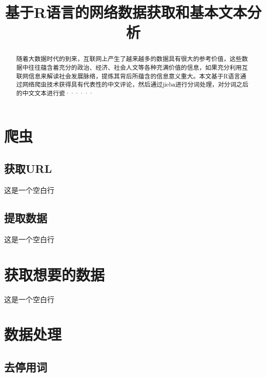 \documentclass[a4paper]{ctexart}     %
\begin{document}
\songti{}
	{\heiti
	\title{基于R语言的网络数据获取和基本文本分析}
	\date{}
	\maketitle
	}
	

	\begin{abstract}
		随着大数据时代的到来，互联网上产生了越来越多的数据具有很大的参考价值，这些数据中往往蕴含着充分的政治、经济、社会人文等各种充满价值的信息，如果充分利用互联网信息来解读社会发展脉络，提炼其背后所蕴含的信息意义重大。本文基于R语言通过网络爬虫技术获得具有代表性的中文评论，然后通过jieba进行分词处理，对分词之后的中文文本进行瓷······
		
		
		\vspace*{1\baselineskip}   %
		
	\end{abstract}

	\tableofcontents  %
	\newpage
	\section{爬虫}
	\subsection{获取URL}

	
	这是一个空白行
	\subsection{提取数据}
	
	这是一个空白行
	
	\section{获取想要的数据}

	这是一个空白行
	
	\section{数据处理}
	
	\subsection{去停用词}
	
\end{document}
